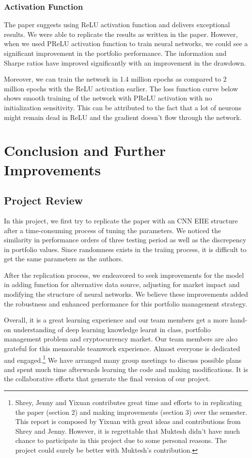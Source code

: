 \documentclass[11pt]{paper}
\begin{document}
		\subsubsection{Activation Function}
		The paper suggests using ReLU activation function and delivers exceptional results. We were able to replicate the results as written in the paper. However, when we used PReLU activation function to train neural networks, we could see a significant improvement in the portfolio performance. The information and Sharpe ratios have improved significantly with an improvement in the drawdown. 

	
		Moreover, we can train the network in 1.4 million epochs as compared to 2 million epochs with the ReLU activation earlier. The loss function curve below shows smooth training of the network with PReLU activation with no initialization sensitivity. This can be attributed to the fact that a lot of neurons might remain dead in ReLU and the gradient doesn’t flow through the network.





	\section{Conclusion and Further Improvements}
	\subsection{Project Review}
	In this project, we first try to replicate the paper with an CNN EIIE structure after a time-consuming process of tuning the parameters. We noticed the similarity in performance orders of three testing period as well as the discrepency in portfolio values. Since randomness exists in the traiing process, it is difficult to get the same parameters as the authors.

	After the replication process, we endeavored to seek improvements for the model in adding function for alternative data source, adjusting for market impact and modifying the structure of neural networks. We believe these improvements added the robustness and enhanced performance for this portfolio management strategy.

	Overall, it is a great learning experience and our team members get a more hand-on understanding of deep learning knowledge learnt in class, portfolio management problem and cryptocurrency market. Our team members are also grateful for this memorable teamwork experience. Almost everyone is dedicated and engaged.\footnote[1]{Shrey, Jenny and Yixuan contributes great time and efforts to in replicating the paper (section 2) and making improvements (section 3) over the semester. This report is composed by Yixuan with great ideas and contributions from Shrey and Jenny. However, it is regrettable that Muktesh didn't have much chance to participate in this project due to some personal reasons. The project could surely be better with Muktesh's contribution.} We have arranged many group meetings to discuss possible plans and spent much time afterwards learning the code and making modifications. It is the collaborative efforts that generate the final version of our project.
	
\end{document}
